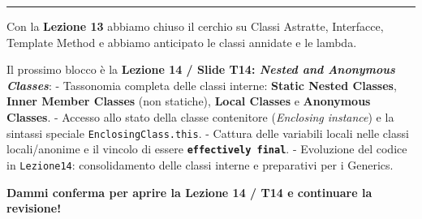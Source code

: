 \documentclass[11pt,a4paper]{article}
\newcommand{\passthrough}[1]{#1}
\begin{document}
\begin{center}\rule{0.5\linewidth}{0.5pt}\end{center}

\begin{studynote} Con la \textbf{Lezione 13} abbiamo chiuso il cerchio su
Classi Astratte, Interfacce, Template Method e abbiamo anticipato le
classi annidate e le lambda.

Il prossimo blocco è la \textbf{Lezione 14 / Slide T14: \emph{Nested and
Anonymous Classes}}: - Tassonomia completa delle classi interne:
\textbf{Static Nested Classes}, \textbf{Inner Member Classes} (non
statiche), \textbf{Local Classes} e \textbf{Anonymous Classes}. -
Accesso allo stato della classe contenitore (\emph{Enclosing instance})
e la sintassi speciale \passthrough{\lstinline!EnclosingClass.this!}. -
Cattura delle variabili locali nelle classi locali/anonime e il vincolo
di essere \textbf{\passthrough{\lstinline!effectively final!}}. -
Evoluzione del codice in \passthrough{\lstinline!Lezione14!}:
consolidamento delle classi interne e preparativi per i Generics.
\end{studynote}

\textbf{Dammi conferma per aprire la Lezione 14 / T14 e continuare la
revisione!}
\end{document}
